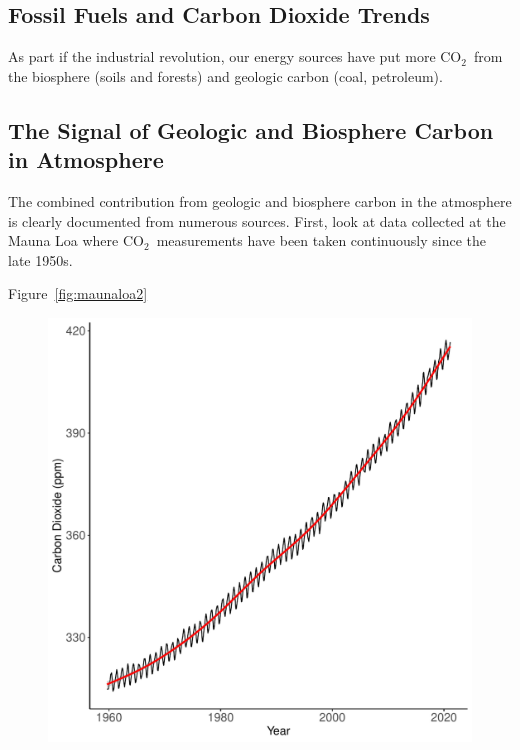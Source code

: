 \documentclass{book}\usepackage{knitr}
\newcommand{\carbondioxide}{CO$_2$~}
\begin{document}
\begin{knitrout}
\begin{kframe}
\section{Fossil Fuels and Carbon Dioxide Trends}\label{sec:fossilfuels}

As part if the industrial revolution, our energy sources have put more \carbondioxide from the biosphere (soils and forests) and geologic carbon (coal, petroleum). 

\subsection{The Signal of Geologic and Biosphere Carbon in Atmosphere}

The combined contribution from geologic and biosphere carbon in the atmosphere is clearly documented from numerous sources. First, look at data collected at the Mauna Loa where \carbondioxide measurements have been taken continuously since the late 1950s. 

Figure~\ref{fig:maunaloa2}

\begin{figure}
\begin{knitrout}
\color{fgcolor}
\includegraphics[width=\maxwidth]{figure/maunaloa3-1} 


\end{knitrout}
\end{figure}
\end{kframe}
\end{knitrout}
\end{document}
